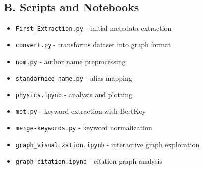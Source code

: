 \documentclass[12pt]{article}
\begin{document}
\subsection*{B. Scripts and Notebooks}
\begin{itemize}
\item \texttt{First\_Extraction.py} - initial metadata extraction
\item \texttt{convert.py} - transforms dataset into graph format
\item \texttt{nom.py} - author name preprocessing
\item \texttt{standarniee\_name.py} - alias mapping
\item \texttt{physics.ipynb} - analysis and plotting
\item \texttt{mot.py} - keyword extraction with BertKey
\item \texttt{merge-keywords.py} - keyword normalization
\item \texttt{graph\_visualization.ipynb} - interactive graph exploration
\item \texttt{graph\_citation.ipynb} - citation graph analysis
\end{itemize}
\end{document}
